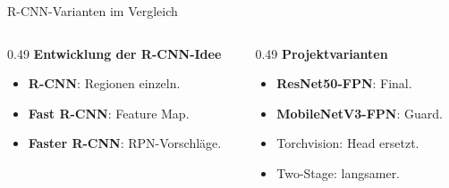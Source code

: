 \begin{frame}{R-CNN-Varianten im Vergleich}
\scriptsize
\begin{columns}[T,onlytextwidth]
\begin{column}{0.49\textwidth}
\textbf{Entwicklung der R-CNN-Idee}
\begin{itemize}\setlength\itemsep{0.10em}
    \item \textbf{R-CNN}: Regionen einzeln.
    \item \textbf{Fast R-CNN}: Feature Map.
    \item \textbf{Faster R-CNN}: RPN-Vorschläge.
\end{itemize}
\end{column}
\begin{column}{0.49\textwidth}
\textbf{Projektvarianten}
\begin{itemize}\setlength\itemsep{0.10em}
    \item \textbf{ResNet50-FPN}: Final.
    \item \textbf{MobileNetV3-FPN}: Guard.
    \item Torchvision: Head ersetzt.
    \item Two-Stage: langsamer.
\end{itemize}
\end{column}
\end{columns}
\end{frame}
